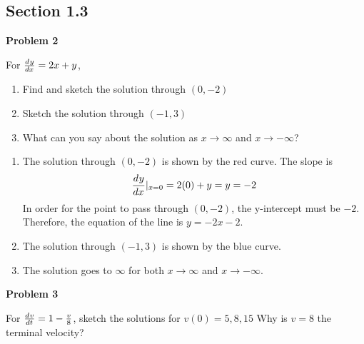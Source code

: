 \subsection*{Section 1.3}
\textbf{Problem 2}

For $\frac{d^{} y}{d x^{}} = 2x+y$,
\begin{enumerate}
    \item Find and sketch the solution through $(0,-2)$
    \item Sketch the solution through $(-1,3)$
    \item What can you say about the solution 
        as $x \to \infty$ and $x \to -\infty$?
\end{enumerate}

\solution
{}

\begin{enumerate}
    \item The solution through $(0, -2)$ is shown by the red curve.
        The slope is
        \[
            \frac{d^{} y}{d x^{}}|_{x=0} 
            = 2(0) + y 
            = y 
            = -2
        \]
        In order for the point to pass through $(0, -2)$, 
        the y-intercept must be $-2$.
        Therefore, the equation of the line is $y = -2x-2$.
    \item The solution through $(-1, 3)$ is shown by the blue curve.
    \item The solution goes to $\infty$ for both 
        $x \to \infty$ and $x \to -\infty$.
\end{enumerate}

\textbf{Problem 3}

For $\frac{d^{} v}{d t^{}} = 1-\frac{v}{8}$, 
sketch the solutions for $v(0) = 5, 8, 15$
Why is $v=8$ the terminal velocity?

\solution

